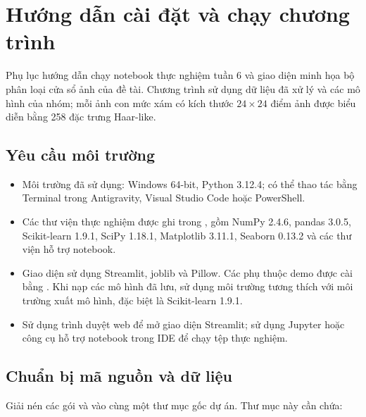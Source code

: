 \documentclass[12pt,a4paper,oneside]{report}
\begin{document}

\chapter{Hướng dẫn cài đặt và chạy chương trình}
\label{pl:huongdan}

Phụ lục hướng dẫn chạy notebook thực nghiệm tuần 6 và giao diện minh họa
bộ phân loại cửa sổ ảnh của đề tài. Chương trình sử dụng dữ liệu đã xử lý
và các mô hình của nhóm; mỗi ảnh con mức xám có kích thước
$24 \times 24$ điểm ảnh được biểu diễn bằng 258 đặc trưng Haar-like.

\section{Yêu cầu môi trường}

\begin{itemize}
    \item Môi trường đã sử dụng: Windows 64-bit, Python 3.12.4;
    có thể thao tác bằng Terminal trong Antigravity, Visual Studio Code
    hoặc PowerShell.
    \item Các thư viện thực nghiệm được ghi trong
    , gồm NumPy 2.4.6, pandas 3.0.5,
    Scikit-learn 1.9.1, SciPy 1.18.1, Matplotlib 3.11.1,
    Seaborn 0.13.2 và các thư viện hỗ trợ notebook.
    \item Giao diện sử dụng Streamlit, joblib và Pillow.
    Các phụ thuộc demo được cài bằng .
    Khi nạp các mô hình đã lưu, sử dụng môi trường tương thích với
    môi trường xuất mô hình, đặc biệt là Scikit-learn 1.9.1.
    \item Sử dụng trình duyệt web để mở giao diện Streamlit;
    sử dụng Jupyter hoặc công cụ hỗ trợ notebook trong IDE để chạy
    tệp thực nghiệm.
\end{itemize}

\section{Chuẩn bị mã nguồn và dữ liệu}

Giải nén các gói  và
 vào cùng một thư mục gốc dự án.
Thư mục này cần chứa:
\end{document}
